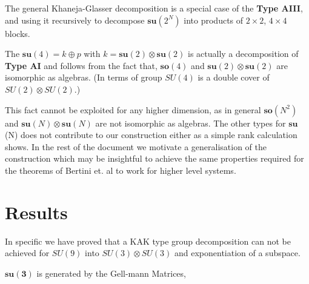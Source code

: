 \documentclass{amsart}
\begin{document}
The general Khaneja-Glasser \cite{KhanejaGlasser, divakaran1980decomposition} decomposition is a special case of the \textbf{Type AIII}, and using it recursively to decompose $\mathbf{su}(2^N)$ into products of $2\times2$, $4\times4$ blocks.

The $\mathbf{su}(4) = k \oplus p$ with $k=\mathbf{su}(2) \otimes \mathbf{su}(2)$ is actually a decomposition of \textbf{Type AI} and follows from the fact that, $\mathbf{so}(4)$ and $\mathbf{su}(2) \otimes \mathbf{su}(2)$ are isomorphic as algebras. (In terms of group $SU(4)$ is a double cover of $SU(2) \otimes SU(2)$.)

This fact cannot be exploited for any higher dimension, as in general $\mathbf{so}(N^2)$ and $\mathbf{su}(N) \otimes \mathbf{su}(N)$ are not isomorphic as algebras. The other types for $\mathbf{su}$(N) does not contribute to our construction either as a simple rank calculation shows. In the rest of the document we motivate a generalisation of the construction which may be insightful to achieve the same properties required for the theorems of Bertini et. al \cite{Bertini1} to work for higher level systems.

\section{Results}

In specific we have proved that a KAK type group decomposition can not be achieved for $SU(9)$ into  $SU(3)\otimes SU(3)$ and exponentiation of a subspace.


\par $\mathbf{su(3)}$ is generated by the Gell-mann Matrices,
\end{document}
